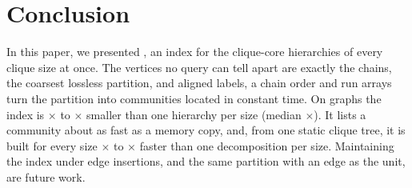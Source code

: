 \section{Conclusion}\label{sec:conclusion}

In this paper, we presented \chainidx, an index for the clique-core hierarchies of every clique size at once.
%
The vertices no query can tell apart are exactly the chains, the coarsest lossless partition, and aligned labels, a chain order and run arrays turn the partition into communities located in constant time.
%
On \numgraphs{} graphs the index is \ratiomin$\times$ to \ratiomax$\times$ smaller than one hierarchy per size (median \ratiomedian$\times$).
%
It lists a community about as fast as a memory copy, and, from one static clique tree, it is built for every size \priormin$\times$ to \priormax$\times$ faster than one decomposition per size.
%
%
Maintaining the index under edge insertions, and the same partition with an edge as the unit, are future work.
